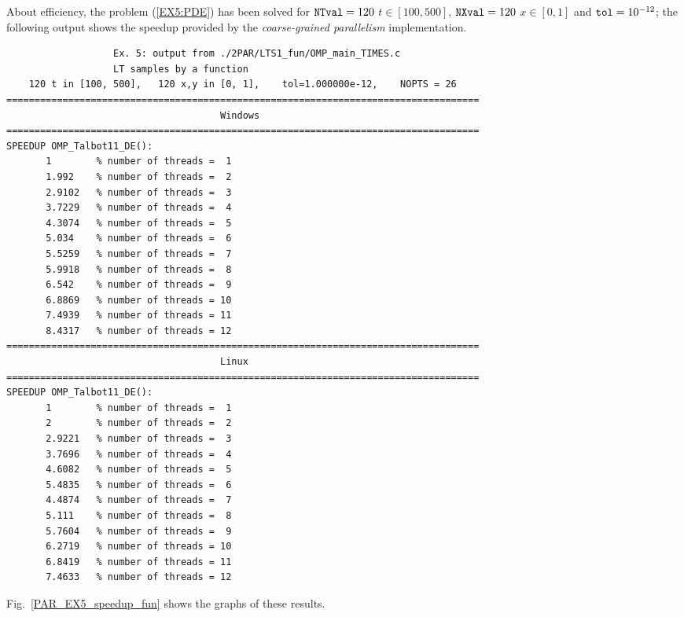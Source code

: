 \documentclass[a4paper,10pt]{report}%
\begin{document}
About efficiency, the problem (\ref{EX5:PDE}) has been solved for ${\tt NTval}=120$ $t\in[100, 500]$,
${\tt NXval}=120$ $x\in[0,1]$ and ${\tt tol}=10^{-12}$; the following output shows the speedup provided by
the {\em coarse-grained parallelism} implementation.
\begin{lstlisting}
                   Ex. 5: output from ./2PAR/LTS1_fun/OMP_main_TIMES.c
                   LT samples by a function
    120 t in [100, 500],   120 x,y in [0, 1],    tol=1.000000e-12,    NOPTS = 26
====================================================================================
                                      Windows
====================================================================================
SPEEDUP OMP_Talbot11_DE():
       1        % number of threads =  1
       1.992    % number of threads =  2
       2.9102   % number of threads =  3
       3.7229   % number of threads =  4
       4.3074   % number of threads =  5
       5.034    % number of threads =  6
       5.5259   % number of threads =  7
       5.9918   % number of threads =  8
       6.542    % number of threads =  9
       6.8869   % number of threads = 10
       7.4939   % number of threads = 11
       8.4317   % number of threads = 12
====================================================================================
                                      Linux
====================================================================================
SPEEDUP OMP_Talbot11_DE():
       1        % number of threads =  1
       2        % number of threads =  2
       2.9221   % number of threads =  3
       3.7696   % number of threads =  4
       4.6082   % number of threads =  5
       5.4835   % number of threads =  6
       4.4874   % number of threads =  7
       5.111    % number of threads =  8
       5.7604   % number of threads =  9
       6.2719   % number of threads = 10
       6.8419   % number of threads = 11
       7.4633   % number of threads = 12
\end{lstlisting}
Fig.~\ref{PAR_EX5_speedup_fun} shows the graphs of these results.
\end{document}
